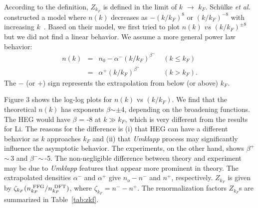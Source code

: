 \documentclass[twocolumn,showpacs,showkeys,fleqn,prl,superscriptaddress]{revtex4}%
\newcommand{\nn}[1]{\textnormal{ #1}}
\newcommand{\ii}[1]{\textit{#1}}
\begin{document}
According to the definition, $Z_{k_F}$ is defined in the limit of $k$ $\to$ $k_F$.
Sch{\"u}lke \ii{et al.}\,\,constructed a model where $n(k)$ decreases as $-(k/k_F)^{8}$ or $(k/k_F)^{-8}$ with increasing $k$~\cite{schulke96}.
Based on their model, we first tried to plot $n(k)$ $vs$ $(k/k_F)^{\pm 8}$ but we did not find a linear behavior.
We assume a more general  power law behavior:
\begin{eqnarray}
n(k) &=& n_0 - \alpha^{-}  (k/k_F)^{\beta^-}  \;\;\;\; (k \leq k_F)  \nonumber \\
&=&  \alpha^{+}  (k/k_F)^{\beta^+}  \;\;\;\;\;\;\;\;\;\;\;\; (k>k_F).
\end{eqnarray}
The $-$ (or $+$) sign represents the extrapolation from  below (or above) $k_F$.

Figure 3 shows the log-log plots for $n(k)$ vs $(k/k_F)$. %
We find that the theoretical $n(k)$ has  exponents $\beta$$\sim\pm$4, depending on the broadening functions.
The HEG  would have $\beta$ = -8 at $k \gg k_F$, which is very different from the results for Li.
The reasons for the difference is (i) that HEG can have a different behavior as $k$ approaches $k_F$ and (ii) that {\it Umklapp} process may significantly influence the asymptotic behavior.
The experiments, on the other hand, shows $\beta^+$$\sim\,$3 and $\beta^-$$\sim\,$-5.
The non-negligible difference between theory and experiment may be due to {\it Umklapp} features that appear more prominent in theory.
The extrapolated densities $\alpha^-$ and $\alpha^+$ give $n_o - n^-$ and $n^+$, respectively.
$Z_{k_F}$ is given by $\zeta_{k_F} (n_{k_F}^{\nn{FFG}}/n_{k_F}^{\nn{DFT}})$, where $\zeta_{k_F}= n^- - n^+$.
The renormalization factors $Z_{k_F}$s are summarized in %
Table~\ref{tab:zkf}.
\end{document}
